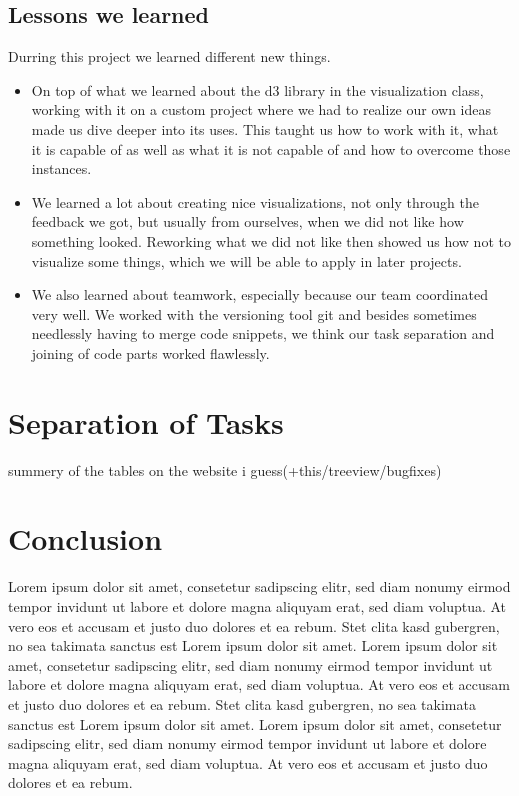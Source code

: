 \documentclass{vgtc}                          %
\begin{document}
\subsection{Lessons we learned}

Durring this project we learned different new things.

\begin{itemize}
\item On top of what we learned about the d3 library in the visualization class, working with it on a custom project where we had to realize our own ideas made us dive deeper into its uses. This taught us how to work with it, what it is capable of as well as what it is not capable of and how to overcome those instances.
\item We learned a lot about creating nice visualizations, not only through the feedback we got, but usually from ourselves, when we did not like how something looked. Reworking what we did not like then showed us how not to visualize some things, which we will be able to apply in later projects.
\item We also learned about teamwork, especially because our team coordinated very well. We worked with the versioning tool git and besides sometimes needlessly having to merge code snippets, we think our task separation and joining of code parts worked flawlessly.
\end{itemize}

\section{Separation of Tasks}

summery of the tables on the website i guess(+this/treeview/bugfixes)

\section{Conclusion}

Lorem ipsum dolor sit amet, consetetur sadipscing elitr, sed diam
nonumy eirmod tempor invidunt ut labore et dolore magna aliquyam erat,
sed diam voluptua. At vero eos et accusam et justo duo dolores et ea
rebum. Stet clita kasd gubergren, no sea takimata sanctus est Lorem
ipsum dolor sit amet. Lorem ipsum dolor sit amet, consetetur
sadipscing elitr, sed diam nonumy eirmod tempor invidunt ut labore et
dolore magna aliquyam erat, sed diam voluptua. At vero eos et accusam
et justo duo dolores et ea rebum. Stet clita kasd gubergren, no sea
takimata sanctus est Lorem ipsum dolor sit amet. Lorem ipsum dolor sit
amet, consetetur sadipscing elitr, sed diam nonumy eirmod tempor
invidunt ut labore et dolore magna aliquyam erat, sed diam
voluptua. At vero eos et accusam et justo duo dolores et ea
rebum.

%

%
%
%


\end{document}
